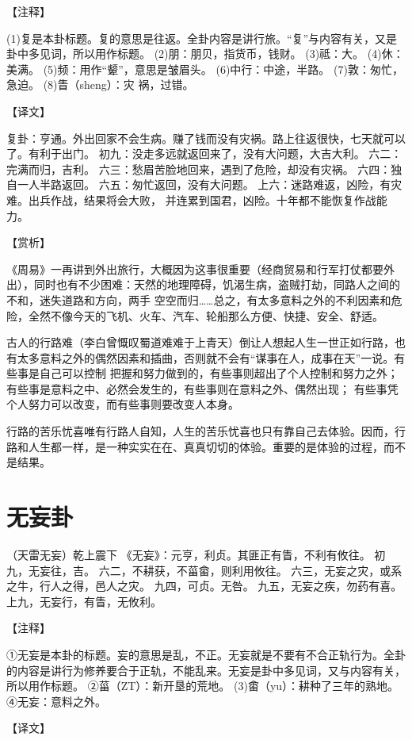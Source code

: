 \documentclass[a4paper,12pt,UTF8,twoside]{ctexbook}
\begin{document}
【注释】

(1)复是本卦标题。复的意思是往返。全卦内容是讲行旅。“复”与内容有关，又是卦中多见词，所以用作标题。
(2)朋：朋贝，指货币，钱财。
(3)祗：大。
(4)休：美满。
(5)频：用作“颦”，意思是皱眉头。
(6)中行：中途，半路。
(7)敦：匆忙，急迫。
(8)眚（sheng）：灾 祸，过错。

【译文】

复卦：亨通。外出回家不会生病。赚了钱而没有灾祸。路上往返很快，七天就可以了。有利于出门。
初九：没走多远就返回来了，没有大问题，大吉大利。
六二：完满而归，吉利。
六三：愁眉苦脸地回来，遇到了危险，却没有灾祸。
六四：独自一人半路返回。
六五：匆忙返回，没有大问题。
上六：迷路难返，凶险，有灾难。出兵作战，结果将会大败， 并连累到国君，凶险。十年都不能恢复作战能力。

【赏析】

《周易》一再讲到外出旅行，大概因为这事很重要（经商贸易和行军打仗都要外出），同时也有不少困难：天然的地理障碍，饥渴生病，盗贼打劫，同路人之间的不和，迷失道路和方向，两手 空空而归……总之，有太多意料之外的不利因素和危险，全然不像今天的飞机、火车、汽车、轮船那么方便、快捷、安全、舒适。

古人的行路难（李白曾慨叹蜀道难难于上青天）倒让人想起人生一世正如行路，也有太多意料之外的偶然因素和插曲，否则就不会有“谋事在人，成事在天”一说。有些事是自己可以控制 把握和努力做到的，有些事则超出了个人控制和努力之外；有些事是意料之中、必然会发生的，有些事则在意料之外、偶然出现； 有些事凭个人努力可以改变，而有些事则要改变人本身。

行路的苦乐忧喜唯有行路人自知，人生的苦乐忧喜也只有靠自己去体验。因而，行路和人生都一样，是一种实实在在、真真切切的体验。重要的是体验的过程，而不是结果。

\chapter{无妄卦}

（天雷无妄）乾上震下
《无妄》：元亨，利贞。其匪正有眚，不利有攸往。
初九，无妄往，吉。
六二，不耕获，不菑畲，则利用攸往。
六三，无妄之灾，或系之牛，行人之得，邑人之灾。
九四，可贞。无咎。
九五，无妄之疾，勿药有喜。
上九，无妄行，有眚，无攸利。

【注释】

①无妄是本卦的标题。妄的意思是乱，不正。无妄就是不要有不合正轨行为。全卦的内容是讲行为修养要合于正轨，不能乱来。无妄是卦中多见词，又与内容有关，所以用作标题。
②菑（ZT）：新开垦的荒地。
(3)畬（yu）：耕种了三年的熟地。
④无妄：意料之外。

【译文】
\end{document}

